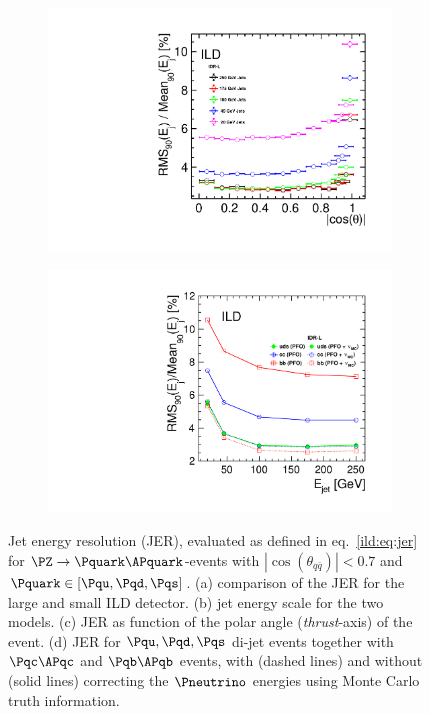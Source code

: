 \begin{figure}[htbp]
\begin{subfigure}{0.49\hsize}
 \caption{  \label{fig:perf:pfa_jes}}
 \end{subfigure}
\begin{subfigure}{0.49\hsize} 
 \includegraphics[width=\hsize]{Performance/fig/JER_uds_costh_IDR.pdf}
 \caption{ \label{fig:perf:pfa_costh}}
 \end{subfigure}
\begin{subfigure}{0.49\hsize} 
 \includegraphics[width=\hsize]{Performance/fig/JERs_bcuds_pfo_vs_pfo_plus_nu.pdf}
 \caption{  \label{fig:perf:pfa_udscb}}
 \end{subfigure}
\caption{
  Jet energy resolution (JER), evaluated as defined in eq.~\ref{ild:eq:jer} for $\PZ\rightarrow \Pquark\APquark$-events with $|\cos(\theta_{q\bar q})|<0.7$
  and $\Pquark \in [\Pqu,\Pqd,\Pqs]$. (a) comparison of the JER for the large and small ILD detector. (b) jet energy scale for the two models. (c) JER as
  function of the polar angle ({\em thrust}-axis) of the event. (d) JER for $\Pqu,\Pqd,\Pqs$ di-jet events together with $\Pqc\APqc$ and $\Pqb\APqb$ events,
  with (dashed lines) and without (solid lines) correcting the $\Pneutrino$ energies using Monte Carlo truth information.
  }
\label{fig:perf:pfa}
\end{figure}
